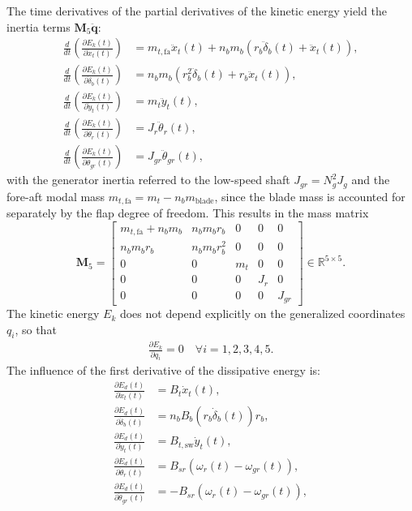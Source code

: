     The time derivatives of the partial derivatives of the kinetic energy yield the inertia terms $\mathbf{M}_5\ddot{\bm{q}}$:
    \begin{align*}
        \frac{d}{dt} \left(\frac{\partial E_k(t)}{\partial \dot{x}_t(t)} \right) &= m_{t,\text{fa}}\ddot{x}_t(t) + n_b m_b(r_b\ddot{\delta}_b(t) + \ddot{x}_t(t)), \\
        \frac{d}{dt} \left(\frac{\partial E_k(t)}{\partial \dot{\delta}_b(t)} \right) &= n_b m_b(r_b^2\ddot{\delta}_b(t) + r_b\ddot{x}_t(t)), \\
        \frac{d}{dt} \left(\frac{\partial E_k(t)}{\partial \dot{y}_t(t)} \right) &= m_t\ddot{y}_t(t), \\
        \frac{d}{dt} \left(\frac{\partial E_k(t)}{\partial \dot{\theta}_r(t)} \right) &= J_r\ddot{\theta}_r(t), \\
        \frac{d}{dt} \left(\frac{\partial E_k(t)}{\partial \dot{\theta}_{gr}(t)} \right) &= J_{gr}\ddot{\theta}_{gr}(t),
    \end{align*}
    with the generator inertia referred to the low-speed shaft $J_{gr} = N_g^2 J_g$ and the fore-aft modal mass $m_{t,\text{fa}} = m_t - n_b m_{\text{blade}}$, since the blade mass is accounted for separately by the flap degree of freedom. This results in the mass matrix
    \[
    \mathbf{M}_5 = \begin{bmatrix}
        m_{t,\text{fa}} + n_b m_b & n_b m_b r_b & 0 & 0 & 0 \\
        n_b m_b r_b & n_b m_b r_b^2 & 0 & 0 & 0 \\
        0 & 0 & m_t & 0 & 0 \\
        0 & 0 & 0 & J_r & 0 \\
        0 & 0 & 0 & 0 & J_{gr}
    \end{bmatrix}  \in \mathbb{R}^{5 \times 5}.
    \]
    The kinetic energy $E_k$ does not depend explicitly on the generalized coordinates $q_i$, so that
    \begin{align*}
        \frac{\partial E_k}{\partial q_i }= 0\quad \forall i = 1, 2, 3, 4, 5.
    \end{align*}
    The influence of the first derivative of the dissipative energy is:
    \begin{align*}
        \frac{\partial E_d(t)}{\partial \dot{x}_t(t) } &= B_t \dot{x}_t(t), \\
        \frac{\partial E_d(t)}{\partial \dot{\delta}_b(t) } &= n_b B_b(r_b \dot{\delta}_b(t)) r_b, \\
        \frac{\partial E_d(t)}{\partial \dot{y}_t(t) } &= B_{t,\text{sw}} \dot{y}_t(t), \\
        \frac{\partial E_d(t)}{\partial \dot{\theta}_r(t) } &= B_{sr}(\omega_r(t) - \omega_{gr}(t)), \\
        \frac{\partial E_d(t)}{\partial \dot{\theta}_{gr}(t) } &= -B_{sr}(\omega_r(t) - \omega_{gr}(t)),
    \end{align*}
